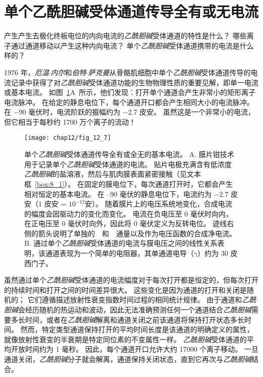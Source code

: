 \section{单个乙酰胆碱受体通道传导全有或无电流}

产生产生去极化终板电位的内向电流的\textit{乙酰胆碱}受体通道的特性是什么？
哪些离子通过通道移动以产生这种内向电流？
单个\textit{乙酰胆碱}受体通道携带的电流是什么样的？


1976 年，\textit{厄温$\cdot$内尔}和\textit{伯特$\cdot$萨克曼}从骨骼肌细胞中单个\textit{乙酰胆碱}受体通道传导的电流记录中获得了对\textit{乙酰胆碱}受体通道功能的生物物理性质的重要见解，即单一电流或基本电流。
如图~\ref{fig:12_7}A~所示，他们发现：打开单个通道会产生非常小的矩形离子电流脉冲。
在给定的静息电位下，每个通道开口都会产生相同大小的电流脉冲。
在 −90 毫伏时，电流阶跃的振幅约为 −2.7 皮安。 
虽然这是一个非常小的电流，但它相当于每秒约 1700 万个离子的流动！


\begin{figure}[htbp]
	\centering
	\texttt{[image: chap12/fig\_12\_7]}
	\caption{单个\textit{乙酰胆碱}受体通道传导全有或全无的基本电流。
		A. 膜片钳技术用于记录单个\textit{乙酰胆碱}受体通道的电流。
		贴片电极充满含有低浓度\textit{乙酰胆碱}的盐溶液，然后与肌肉膜表面紧密接触（见文本框~\ref{box:8_1}）。
		在固定的膜电位下，每次通道打开时，它都会产生相对恒定的基本电流。
		在 –90 毫伏的静息电位下，电流约为 −2.7 皮安（1 皮安 = $10^{-12}$安）。
		随着膜片上的电压系统地变化，合成电流的幅度会因驱动力的变化而变化。
		电流在负电压至 0 毫伏时向内，在正电压至 0 毫伏时向外，因此将 0 毫伏定义为反转电位。
		迹线右侧的箭头说明了单独的~~和~~通量以及作为电压函数的合成净电流。
		B. 通过单个\textit{乙酰胆碱}受体通道的电流与膜电压之间的线性关系表明，该通道表现为一个简单的电阻器，其单通道电导（$\gamma$）约为 30 皮西门子。}
	\label{fig:12_7}
\end{figure}


虽然通过单个\textit{乙酰胆碱}受体通道的电流幅度对于每次打开都是恒定的，但每次打开的持续时间和打开之间的时间差异很大。
这些变化是因为通道的打开和关闭是随机的；
它们遵循描述放射性衰变指数时间过程的相同统计规律。 
由于通道和\textit{乙酰胆碱}会经历随机的热运动和波动，因此无法准确预测任何一个通道结合\textit{乙酰胆碱}需要多长时间，或者在\textit{乙酰胆碱}解离和通道关闭之前该通道将保持打开状态多长时间。
然而，特定类型通道保持打开的平均时间长度是该通道的明确定义的属性，就像放射性衰变的半衰期是特定同位素的不变属性一样。
\textit{乙酰胆碱}受体通道的平均开放时间约为 1 毫秒。
因此，每个通道开口允许大约 17000 个离子移动。
一旦通道关闭，\textit{乙酰胆碱}分子就会解离，通道保持关闭状态，直到它再次与\textit{乙酰胆碱}结合。



